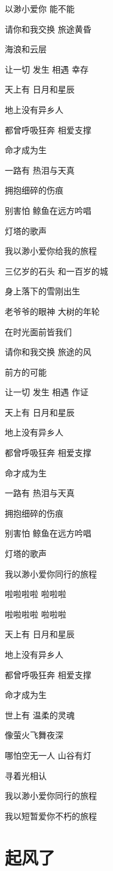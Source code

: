 \documentclass[]{ctexbook}
\begin{document}
以渺小爱你 能不能

请你和我交换 旅途黄昏

海浪和云层

让一切 发生 相遇 幸存

天上有 日月和星辰

地上没有异乡人

都曾呼吸狂奔 相爱支撑

命才成为生

一路有 热泪与天真

拥抱细碎的伤痕

别害怕 鲸鱼在远方吟唱

灯塔的歌声

我以渺小爱你给我的旅程

三亿岁的石头 和一百岁的城

身上落下的雪刚出生

老爷爷的眼神 大树的年轮

在时光面前皆我们

请你和我交换 旅途的风

前方的可能

让一切 发生 相遇 作证

天上有 日月和星辰

地上没有异乡人

都曾呼吸狂奔 相爱支撑

命才成为生

一路有 热泪与天真

拥抱细碎的伤痕

别害怕 鲸鱼在远方吟唱

灯塔的歌声

我以渺小爱你同行的旅程

啦啦啦啦 啦啦啦

啦啦啦啦 啦啦啦

天上有 日月和星辰

地上没有异乡人

都曾呼吸狂奔 相爱支撑

命才成为生

世上有 温柔的灵魂

像萤火飞舞夜深

哪怕空无一人 山谷有灯

寻着光相认

我以渺小爱你同行的旅程

我以短暂爱你不朽的旅程

\section*{起风了}\label{the-wind-rises}
\end{document}
